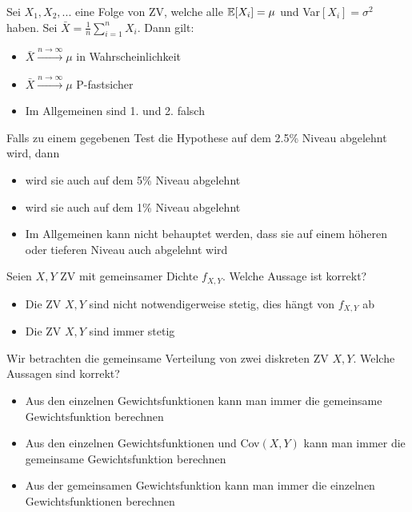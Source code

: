 \hrulefill

Sei $X_1, X_2,...$ eine Folge von ZV, welche alle $\mathbb{E}[X_i] = \mu$ und Var$[X_i] = \sigma^2$ haben. Sei $\bar X = \frac{1}{n	} \sum_{i=1}^n X_i$. Dann gilt:
\begin{itemize}
	\item[$\square$] $\bar X \xrightarrow{n \to \infty} \mu$ in Wahrscheinlichkeit
	\item[$\square$] $\bar X \xrightarrow{n \to \infty} \mu$ P-fastsicher
	\item[\marked] Im Allgemeinen sind 1. und 2. falsch
\end{itemize} 

\hrulefill

Falls zu einem gegebenen Test die Hypothese auf dem 2.5\% Niveau abgelehnt wird, dann
\begin{itemize}
	\item[\marked] wird sie auch auf dem 5\% Niveau abgelehnt
	\item[$\square$]  wird sie auch auf dem 1\% Niveau abgelehnt
	\item[$\square$] Im Allgemeinen kann nicht behauptet werden, dass sie auf einem höheren oder tieferen Niveau auch abgelehnt wird
\end{itemize} 

\hrulefill

Seien $X, Y$ ZV mit gemeinsamer Dichte $f_{X,Y}$. Welche Aussage ist korrekt?
\begin{itemize}
	\item[$\square$] Die ZV $X,Y$ sind nicht notwendigerweise stetig, dies hängt von $f_{X,Y}$ ab
	\item[\marked] Die ZV $X,Y$ sind immer stetig
\end{itemize}

\hrulefill

Wir betrachten die gemeinsame Verteilung von zwei diskreten ZV $X,Y$. Welche Aussagen sind korrekt?
\begin{itemize}
	\item[$\square$] Aus den einzelnen Gewichtsfunktionen kann man immer die gemeinsame Gewichtsfunktion berechnen
	\item[$\square$] Aus den einzelnen Gewichtsfunktionen und Cov$(X,Y)$ kann man immer die gemeinsame Gewichtsfunktion berechnen
	\item[\marked] Aus der gemeinsamen Gewichtsfunktion kann man immer die einzelnen Gewichtsfunktionen berechnen
\end{itemize}


